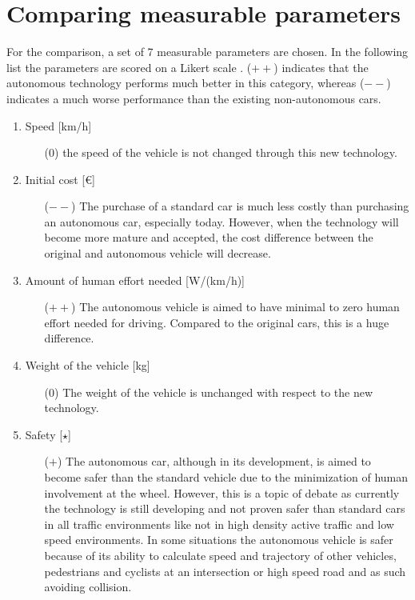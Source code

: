 \documentclass[a4paper]{article}
\begin{document}
\section{Comparing measurable parameters}
\label{sec:comparing}

For the comparison, a set of 7 measurable parameters are chosen. In the following list the parameters are scored on a Likert scale \cite{likert}. ($++$) indicates that the autonomous technology performs much better in this category, whereas ($--$) indicates a much worse performance than the existing non-autonomous cars.

\begin{enumerate}
\item Speed [km/h]
    \begin{enumerate}
    \item[($0$)] the speed of the vehicle is not changed through this new technology.
    \end{enumerate}
\item Initial cost [€]
    \begin{enumerate}
    \item[($--$)] The purchase of a standard car is much less costly than purchasing an autonomous car, especially today.  However, when the technology will become more mature and accepted, the cost difference between the original and autonomous vehicle will decrease.
    \end{enumerate}
\item Amount of human effort needed [W/(km/h)]
    \begin{enumerate}
    \item[($++$)] The autonomous vehicle is aimed to have minimal to zero human effort needed for driving. Compared to the original cars, this is a huge difference.
    \end{enumerate}
\item Weight of the vehicle [kg]
    \begin{enumerate}
    \item[($0$)] The weight of the vehicle is unchanged with respect to the new technology.
    \end{enumerate}
\item Safety [$\star$]
    \begin{enumerate}
    \item[($+$)] The autonomous car, although in its development, is aimed to become safer than the standard vehicle due to the minimization of human involvement at the wheel. However, this is a topic of debate as currently the technology is still developing and not proven safer than standard cars in all traffic environments like not in high density active traffic and low speed environments. In some situations the autonomous vehicle is safer because of its ability to calculate speed and trajectory of other vehicles, pedestrians and cyclists at an intersection or high speed road and as such avoiding collision.

\end{enumerate}
\end{enumerate}
\end{document}
